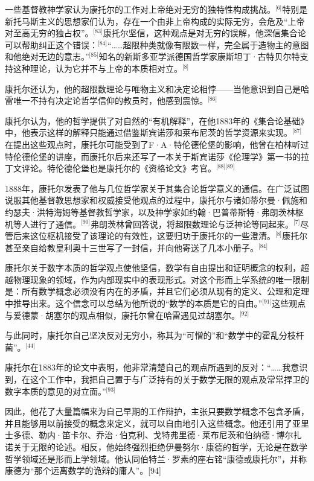 一些基督教神学家认为康托尔的工作对上帝绝对无穷的独特性构成挑战。\(^\text{[6]}\)特别是新托马斯主义的思想家们认为，存在一个由非上帝构成的实际无穷，会危及“上帝对至高无穷的独占权”。\(^\text{[83]}\)康托尔坚信，这种观点是对无穷的误解，他深信集合论可以帮助纠正这个错误：\(^\text{[84]}\)“……超限种类就像有限数一样，完全属于造物主的意图和他绝对无边的意志。”\(^\text{[85]}\)知名的新斯多亚学派德国哲学家康斯坦丁·古特贝尔特支持这种理论，认为它并不与上帝的本质相对立。\(^\text{[8]}\)

康托尔还认为，他的超限数理论与唯物主义和决定论相悖——当他意识到自己是哈雷唯一不持有决定论哲学信仰的教员时，他感到震惊。\(^\text{[86]}\)

康托尔认为，他的哲学提供了对自然的“有机解释”，在他1883年的《集合论基础》中，他表示这样的解释只能通过借鉴斯宾诺莎和莱布尼茨的哲学资源来实现。\(^\text{[87]}\)在提出这些观点时，康托尔可能受到了F·A·特伦德伦堡的影响，他曾在柏林听过特伦德伦堡的讲座，而康托尔后来还写了一本关于斯宾诺莎《伦理学》第一书的拉丁文评论。特伦德伦堡也是康托尔的《资格论文》考官。\(^\text{[88][89]}\)

1888年，康托尔发表了他与几位哲学家关于其集合论哲学意义的通信。在广泛试图说服其他基督教思想家和权威接受他观点的过程中，康托尔与诸如蒂尔曼·佩施和约瑟夫·洪特海姆等基督教哲学家，以及神学家如约翰·巴普蒂斯特·弗朗茨林枢机等人进行了通信。\(^\text{[90]}\)弗朗茨林曾回答说，将超限数理论与泛神论等同起来。\(^\text{[7]}\)尽管后来这位枢机接受了该理论的有效性，这要归功于康托尔的一些澄清。\(^\text{[8]}\)康托尔甚至亲自给教皇利奥十三世写了一封信，并向他寄送了几本小册子。\(^\text{[84]}\)

康托尔关于数字本质的哲学观点使他坚信，数学有自由提出和证明概念的权利，超越物理现象的领域，作为内部现实中的表现形式。对这个形而上学系统的唯一限制是：所有数学概念必须没有内在的矛盾，并且它们必须从现有的定义、公理和定理中推导出来。这个信念可以总结为他所说的“数学的本质是它的自由。”\(^\text{[91]}\)这些观点与爱德蒙·胡塞尔的观点相似，康托尔曾在哈雷遇见过胡塞尔。\(^\text{[92]}\)

与此同时，康托尔自己坚决反对无穷小，称其为“可憎的”和“数学中的霍乱分枝杆菌”。\(^\text{[44]}\)

康托尔在1883年的论文中表明，他非常清楚自己的观点所遇到的反对：“……我意识到，在这个工作中，我把自己置于与广泛持有的关于数学无限的观点及常常捍卫的数字本质的意见的对立面。”\(^\text{[93]}\)

因此，他花了大量篇幅来为自己早期的工作辩护，主张只要数学概念不包含矛盾，并且能够用以前接受的概念来定义，就可以自由地引入这些概念。他还引用了亚里士多德、勒内·笛卡尔、乔治·伯克利、戈特弗里德·莱布尼茨和伯纳德·博尔扎诺关于无限的论述。相反，他始终强烈拒绝伊曼努尔·康德的哲学，无论是在数学哲学领域还是形而上学领域。他认同伯特兰·罗素的座右铭“康德或康托尔”，并称康德为“那个远离数学的诡辩的庸人”。[94]
